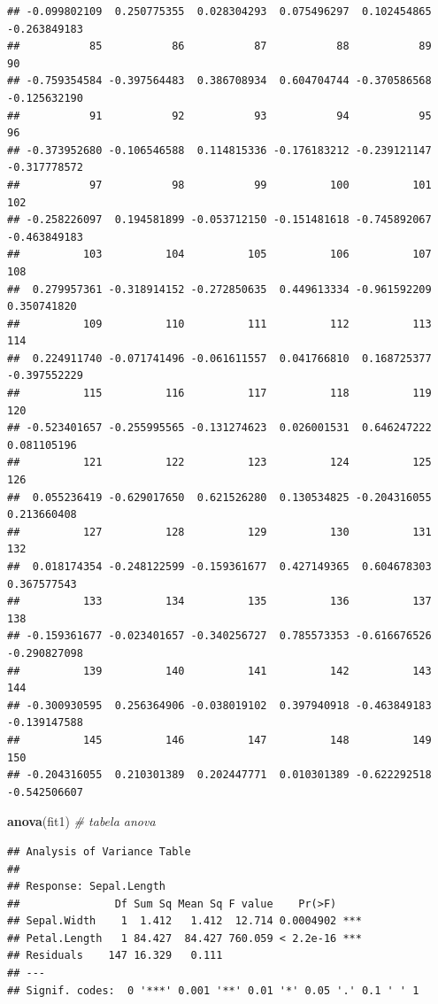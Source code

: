 \documentclass[
]{book}
\newenvironment{Shaded}{\begin{snugshade}}{\end{snugshade}}
\newcommand{\CommentTok}[1]{\textcolor[rgb]{0.56,0.35,0.01}{\textit{#1}}}
\newcommand{\KeywordTok}[1]{\textcolor[rgb]{0.13,0.29,0.53}{\textbf{#1}}}
\newcommand{\NormalTok}[1]{#1}
\begin{document}
\begin{verbatim}
## -0.099802109  0.250775355  0.028304293  0.075496297  0.102454865 -0.263849183 
##           85           86           87           88           89           90 
## -0.759354584 -0.397564483  0.386708934  0.604704744 -0.370586568 -0.125632190 
##           91           92           93           94           95           96 
## -0.373952680 -0.106546588  0.114815336 -0.176183212 -0.239121147 -0.317778572 
##           97           98           99          100          101          102 
## -0.258226097  0.194581899 -0.053712150 -0.151481618 -0.745892067 -0.463849183 
##          103          104          105          106          107          108 
##  0.279957361 -0.318914152 -0.272850635  0.449613334 -0.961592209  0.350741820 
##          109          110          111          112          113          114 
##  0.224911740 -0.071741496 -0.061611557  0.041766810  0.168725377 -0.397552229 
##          115          116          117          118          119          120 
## -0.523401657 -0.255995565 -0.131274623  0.026001531  0.646247222  0.081105196 
##          121          122          123          124          125          126 
##  0.055236419 -0.629017650  0.621526280  0.130534825 -0.204316055  0.213660408 
##          127          128          129          130          131          132 
##  0.018174354 -0.248122599 -0.159361677  0.427149365  0.604678303  0.367577543 
##          133          134          135          136          137          138 
## -0.159361677 -0.023401657 -0.340256727  0.785573353 -0.616676526 -0.290827098 
##          139          140          141          142          143          144 
## -0.300930595  0.256364906 -0.038019102  0.397940918 -0.463849183 -0.139147588 
##          145          146          147          148          149          150 
## -0.204316055  0.210301389  0.202447771  0.010301389 -0.622292518 -0.542506607
\end{verbatim}

\begin{Shaded}
\begin{Highlighting}[]
\KeywordTok{anova}\NormalTok{(fit1) }\CommentTok{# tabela anova}
\end{Highlighting}
\end{Shaded}

\begin{verbatim}
## Analysis of Variance Table
## 
## Response: Sepal.Length
##               Df Sum Sq Mean Sq F value    Pr(>F)    
## Sepal.Width    1  1.412   1.412  12.714 0.0004902 ***
## Petal.Length   1 84.427  84.427 760.059 < 2.2e-16 ***
## Residuals    147 16.329   0.111                      
## ---
## Signif. codes:  0 '***' 0.001 '**' 0.01 '*' 0.05 '.' 0.1 ' ' 1
\end{verbatim}
\end{document}
